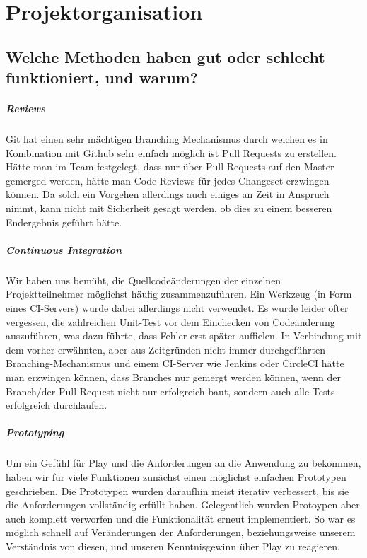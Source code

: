 \documentclass[12pt,DIV14,BCOR10mm,a4paper,parskip=half-,headsepline,headinclude,english,ngerman,bibliography=totocnumbered]{scrreprt}
\begin{document}
\vspace*{-3cm}

\tableofcontents  %

\chapter{Projektorganisation}


\section{Welche Methoden haben gut oder schlecht funktioniert, und warum?}

\paragraph{Reviews}
Git hat einen sehr mächtigen Branching Mechanismus durch welchen es in Kombination mit Github sehr einfach möglich ist Pull Requests zu erstellen. Hätte man im Team festgelegt, dass nur über Pull Requests auf den Master gemerged werden, hätte man Code Reviews für jedes Changeset erzwingen können. Da solch ein Vorgehen allerdings auch einiges an Zeit in Anspruch nimmt, kann nicht mit Sicherheit gesagt werden, ob dies zu einem besseren Endergebnis geführt hätte.

\paragraph{Continuous Integration}
Wir haben uns bemüht, die Quellcodeänderungen der einzelnen Projektteilnehmer möglichst häufig zusammenzuführen. Ein Werkzeug (in Form eines CI-Servers) wurde dabei allerdings nicht verwendet. Es wurde leider öfter vergessen, die zahlreichen Unit-Test vor dem Einchecken von Codeänderung auszuführen, was dazu führte, dass Fehler erst später auffielen.
In Verbindung mit dem vorher erwähnten, aber aus Zeitgründen nicht immer durchgeführten Branching-Mechanismus und einem CI-Server wie Jenkins oder CircleCI hätte man erzwingen können, dass Branches nur gemergt werden können, wenn der Branch/der Pull Request nicht nur erfolgreich baut, sondern auch alle Tests erfolgreich durchlaufen.

\paragraph{Prototyping}
Um ein Gefühl für Play und die Anforderungen an die Anwendung zu bekommen, haben wir für viele Funktionen zunächst einen möglichst einfachen Prototypen geschrieben. Die Prototypen wurden daraufhin meist iterativ verbessert, bis sie die Anforderungen vollständig erfüllt haben. Gelegentlich wurden Protoypen aber auch komplett verworfen und die Funktionalität erneut implementiert. So war es möglich schnell auf Veränderungen der Anforderungen, beziehungsweise unserem Verständnis von diesen, und unseren Kenntnisgewinn über Play zu reagieren.
\end{document}
